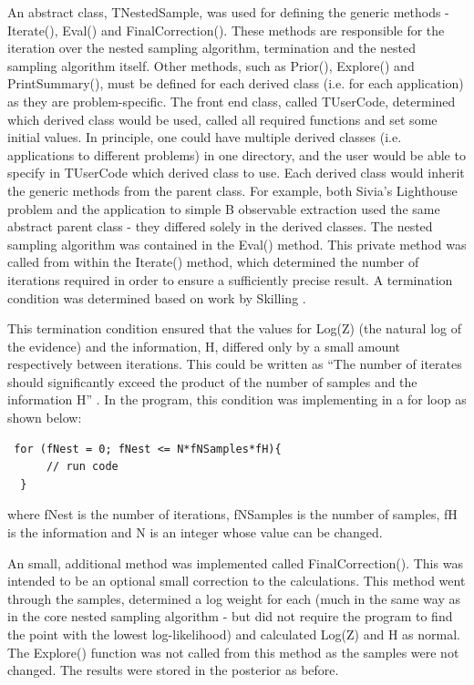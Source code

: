 \documentclass[a4paper,12pt]{article}
\begin{document}
An abstract class, TNestedSample, was used for defining the generic methods - Iterate(), Eval() and FinalCorrection().  These methods are responsible for the iteration over the nested sampling algorithm, termination and the nested sampling algorithm itself.  Other methods, such as Prior(), Explore() and PrintSummary(), must be defined for each derived class (i.e. for each application) as they are problem-specific.  The front end class, called TUserCode, determined which derived class would be used, called all required functions and set some initial values.  In principle, one could have multiple derived classes (i.e. applications to different problems) in one directory, and the user would be able to specify in TUserCode which derived class to use.  Each derived class would inherit the generic methods from the parent class.  For example, both Sivia's Lighthouse problem and the application to simple B observable extraction used the same abstract parent class - they differed solely in the derived classes.  
\newline
The nested sampling algorithm was contained in the Eval() method.  This private method was called from within the Iterate() method, which determined the number of iterations required in order to ensure a sufficiently precise result. A termination condition was determined based on work by Skilling \cite{skilling}.


This termination condition ensured that the values for Log(Z) (the natural log of the evidence) and the information, H, differed only by a small amount respectively between iterations.  This could be written as ``The number of iterates should significantly exceed the product of the number of samples and the information H'' \cite{skilling}.
\newline
In the program, this condition was implementing in a for loop as shown below:
\newline
\begin{verbatim}
 for (fNest = 0; fNest <= N*fNSamples*fH){
      // run code
  }
\end{verbatim}
where fNest is the number of iterations, fNSamples is the number of samples, fH is the information and N is an integer whose value can be changed.  

An small, additional method was implemented called FinalCorrection().  This was intended to be an optional small correction to the calculations.  This method went through the samples, determined a log weight for each (much in the same way as in the core nested sampling algorithm - but did not require the program to find the point with the lowest log-likelihood) and calculated Log(Z) and H as normal.  The Explore() function was not called from this method as the samples were not changed.  The results were stored in the posterior as before.  
\end{document}
